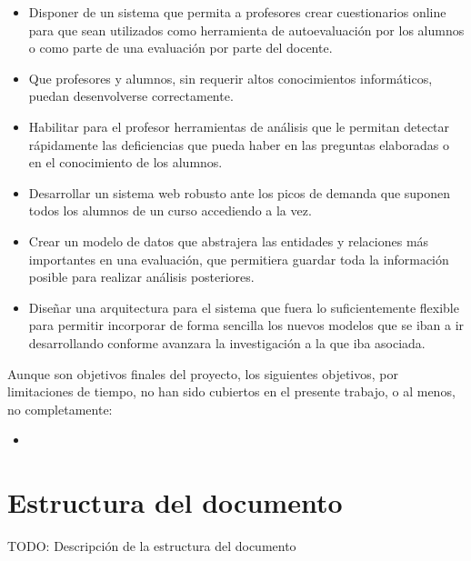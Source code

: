 \begin{itemize}
	\item Disponer de un sistema que permita a profesores crear cuestionarios online para que sean utilizados como herramienta de autoevaluación por los alumnos o como parte de una evaluación por parte del docente.
	\item Que profesores y alumnos, sin requerir altos conocimientos informáticos, puedan desenvolverse correctamente.
	\item Habilitar para el profesor herramientas de análisis que le permitan detectar rápidamente las deficiencias que pueda haber en las preguntas  elaboradas o en el conocimiento de los alumnos.
	\item Desarrollar un sistema web robusto ante los picos de demanda que suponen todos los alumnos de un curso accediendo a la vez.
	\item Crear un modelo de datos que abstrajera las entidades y relaciones más importantes en una evaluación, que permitiera guardar toda la información posible para realizar análisis posteriores.
	\item Diseñar una arquitectura para el sistema que fuera lo suficientemente flexible para permitir incorporar de forma sencilla los nuevos modelos que se iban a ir desarrollando conforme avanzara la investigación a la que iba asociada.
\end{itemize}

Aunque son objetivos finales del proyecto, los siguientes objetivos, por limitaciones de tiempo, no han sido cubiertos en el presente trabajo, o al menos, no completamente:

\begin{itemize}
	\item
\end{itemize}



\section{Estructura del documento}

TODO: Descripción de la estructura del documento

